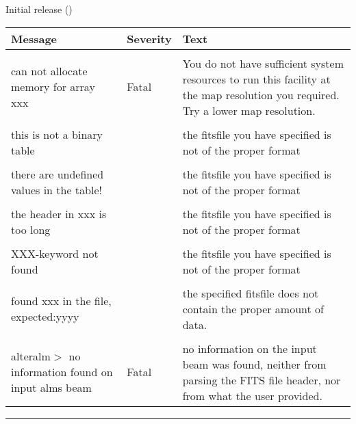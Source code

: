 \begin{release}
  \begin{relist}
    \item Initial release ()
  \end{relist}
\end{release}

\begin{messages}
{
\begin{tabular}{p{0.25\hsize} p{0.1\hsize} p{0.35\hsize}} \hline  
  \textbf{Message} & \textbf{Severity} & \textbf{Text} \\ \hline
                   &                   &   \\ %
can not allocate memory for array xxx &  Fatal & You do not have
                   sufficient system resources to run this
                   facility at the map resolution you required. 
  Try a lower map resolution.  \\ 
                   &                   &   \\ \hline %

this is not a binary table & & the fitsfile you have specified is not 
of the proper format \\
                   &                   &   \\ \hline %
there are undefined values in the table! & & the fitsfile you have specified is not 
of the proper format \\
                  &                   &   \\ \hline %
the header in xxx is too long & & the fitsfile you have specified is not 
of the proper format \\
                  &                   &   \\ \hline %
XXX-keyword not found & & the fitsfile you have specified is not 
of the proper format \\
                  &                   &   \\ \hline %
found xxx in the file, expected:yyyy & & the specified fitsfile does not
contain the proper amount of data. \\
                   &                   &   \\ \hline %

alteralm$>$ no information found on input alms beam & Fatal & no information on
the input beam was found, neither from parsing the FITS file header, nor from
what the user provided.

\end{tabular}
} 
\end{messages}

\rule{\hsize}{2mm}

\newpage
